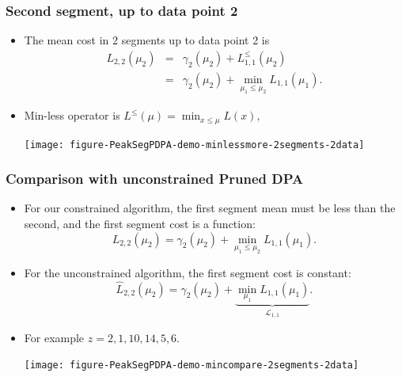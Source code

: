 \documentclass{beamer}
\begin{document}
\begin{frame}[fragile]
  \frametitle{Second segment, up to data point 2}
  \begin{itemize}
  \item The mean cost in 2 segments up to data point 2 is
\begin{eqnarray*}
  L_{2,2}(\mu_2) &=& \gamma_2(\mu_2)+
   L_{1,1}^{\leq}(\mu_2)\\
  &=&  \gamma_2(\mu_2)+
   \min_{\mu_1 \leq \mu_2} L_{1,1}(\mu_1).
\end{eqnarray*}
\item Min-less operator is $L^\leq(\mu) = \min_{x\leq\mu} L(x),$
    \begin{center}
      \texttt{[image: figure-PeakSegPDPA-demo-minlessmore-2segments-2data]}
    \end{center}
\end{itemize}
\end{frame}

\begin{frame}
  \frametitle{Comparison with unconstrained Pruned DPA}
  \begin{itemize}
  \item For our constrained algorithm, the first segment mean must be
    less than the second, and the first segment cost is a function:
    \begin{equation*}
      L_{2,2}(\mu_2) = \gamma_2(\mu_2)+
      \min_{\mu_1 \leq \mu_2} L_{1,1}(\mu_1).
    \end{equation*}
  \item For the unconstrained algorithm, the first segment cost is constant:
    \begin{equation*}
      \widehat{L}_{2,2}(\mu_2) = \gamma_2(\mu_2)+
      \underbrace{\min_{\mu_1} L_{1,1}(\mu_1)}_{\mathcal L_{1,1}}.
    \end{equation*}
  \item For example $z = 2, 1, 10, 14, 5, 6$.
    \begin{center}
      \texttt{[image: figure-PeakSegPDPA-demo-mincompare-2segments-2data]}
    \end{center}
  \end{itemize}
\end{frame}
\end{document}
